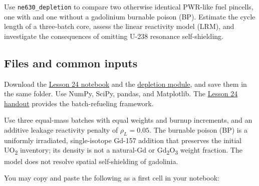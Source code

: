 Use \texttt{ne630\_depletion} to compare two otherwise identical PWR-like fuel pincells, one with and one without a gadolinium burnable poison (BP). Estimate the cycle length of a three-batch core, assess the linear reactivity model (LRM), and investigate the consequences of omitting U-238 resonance self-shielding.

\subsection*{Files and common inputs}

Download the \href{https://robertsj.github.io/ne630/_static/notebooks/lesson_24.ipynb}{Lesson 24 notebook} and the \href{https://robertsj.github.io/ne630/_static/notebooks/ne630_depletion.py}{depletion module}, and save them in the same folder. Use NumPy, SciPy, pandas, and Matplotlib. The \href{https://robertsj.github.io/ne630/_static/handouts/lesson-24/lesson_24_handout.pdf}{Lesson 24 handout} provides the batch-refueling framework.

Use three equal-mass batches with equal weights and burnup increments, and an additive leakage reactivity penalty of \(\rho_L=0.05\). The burnable poison (BP) is a uniformly irradiated, single-isotope Gd-157 addition that preserves the initial UO\textsubscript{2} inventory; its density is not a natural-Gd or Gd\textsubscript{2}O\textsubscript{3} weight fraction. The model does not resolve spatial self-shielding of gadolinia.

You may copy and paste the following as a first cell in your notebook:


